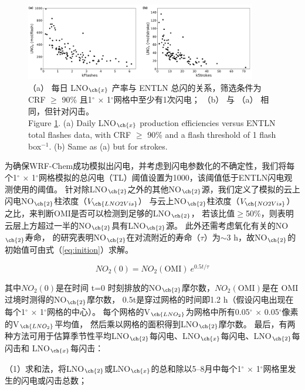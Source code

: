 \begin{figure}[H]
\centering
\includegraphics[width=0.9\textwidth]{./figures/us_flash_threshold.png}
\caption{
（a） 每日 LNO$_{\ch{x}}$ 产率与 ENTLN 总闪的关系，筛选条件为CRF $\geq$ 90\% 且1$^{\circ}$ $\times$ 1$^{\circ}$网格中至少有1次闪电；
 （b） 与 （a） 相同，但针对闪击。\\
Figure \ref{fig:us_flash_threshold}. (a) Daily LNO$_{\ch{x}}$ production efficiencies versus ENTLN total flashes data, with CRF $\geq$ 90\% and a flash threshold of 1 flash box$^{-1}$.
(b) Same as (a) but for strokes.}
\label{fig:us_flash_threshold}
\end{figure}


为确保WRF-Chem成功模拟出闪电，并考虑到闪电参数化的不确定性，我们将每个1$^{\circ}$ $\times$ 1$^{\circ}$网格模拟的总闪电（TL）阈值设置为1000，该阈值低于ENTLN闪电观测使用的阈值。
针对除LNO$_{\ch{2}}$之外的其他NO$_{\ch{2}}$源，我们定义了模拟的云上闪电NO$_{\ch{2}}$柱浓度（$V_{\ch{LNO2Vis}}$）
与云上NO$_{\ch{2}}$柱浓度（$V_{\ch{NO2Vis}}$）之比，来判断OMI是否可以检测到足够的LNO$_{\ch{2}}$，
若该比值$\geq$50\%，则表明云层上方超过一半的NO$_{\ch{2}}$具有LNO$_{\ch{2}}$源。
此外还需考虑氧化有关的NO$_{\ch{2}}$寿命，
\citet{Nault.2017}的研究表明NO$_{\ch{2}}$在对流附近的寿命（$\tau$）为$\sim$3 h，故NO$_{\ch{2}}$的初始值可由式（\ref{eq:inition}）求解。

\begin{equation} \label{eq:inition}
NO_2(0) = NO_2(\mathrm{OMI})\ e^{0.5t/\tau}
\end{equation}

其中$NO_2(0)$是在时间 t=0 时刻排放的NO$_{\ch{2}}$摩尔数，$NO_2(\mathrm{OMI})$是在 OMI 过境时测得的NO$_{\ch{2}}$摩尔数，
0.5t是穿过网格的时间即1.2 h（假设闪电出现在每个1$^{\circ}$ $\times$ 1$^{\circ}$网格的中心）。
每个网格的V$_{\ch{LNO_2}}$为网格中所有0.05$^{\circ}$ $\times$ 0.05$^{\circ}$像素的V$_{\ch{LNO_2}}$平均值，
然后乘以网格的面积得到LNO$_{\ch{2}}$摩尔数。
最后，有两种方法可用于估算季节性平均LNO$_{\ch{2}}$每闪电、LNO$_{\ch{x}}$每闪电、LNO$_{\ch{2}}$每闪击和 LNO$_{\ch{x}}$每闪击：

（1）求和法，将LNO$_{\ch{2}}$或LNO$_{\ch{x}}$的总和除以5--8月中每个1$^{\circ}$ $\times$ 1$^{\circ}$网格里发生的闪电或闪击总数；

